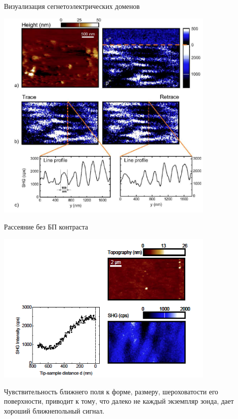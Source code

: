 \documentclass[9pt, compress, xcolor=table]{beamer}
\begin{document}
\begin{frame}{Визуализация сегнетоэлектрических доменов}

\begin{center}
\includegraphics[width=0.8\textwidth]{shg20}

\end{center}

\end{frame}
\begin{frame}{Рассеяние без БП контраста}

\begin{center}
\includegraphics[width=0.8\textwidth]{shg22}

\end{center}

Чувствительность ближнего поля к форме, размеру, шероховатости его поверхности, приводит к тому, что далеко не каждый экземпляр зонда, дает хороший ближнепольный сигнал.


\end{frame}
\end{document}
